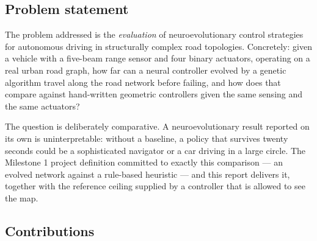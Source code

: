 \documentclass[conference]{IEEEtran}
\begin{document}
\subsection{Problem statement}

\label{sec:problem}

The problem addressed is the \emph{evaluation} of neuroevolutionary control strategies for autonomous driving in structurally complex road topologies. Concretely: given a vehicle with a five-beam range sensor and four binary actuators, operating on a real urban road graph, how far can a neural controller evolved by a genetic algorithm travel along the road network before failing, and how does that compare against hand-written geometric controllers given the same sensing and the same actuators?

The question is deliberately comparative. A neuroevolutionary result reported on its own is uninterpretable: without a baseline, a policy that survives twenty seconds could be a sophisticated navigator or a car driving in a large circle. The Milestone 1 project definition committed to exactly this comparison — an evolved network against a rule-based heuristic — and this report delivers it, together with the reference ceiling supplied by a controller that is allowed to see the map.

\subsection{Contributions}

\label{sec:contributions}
\end{document}
